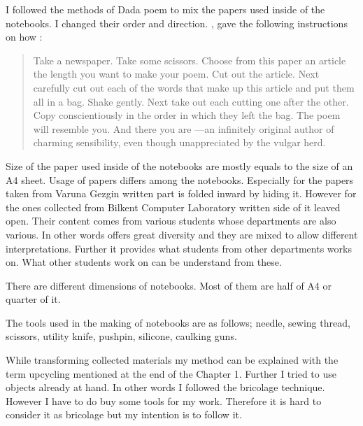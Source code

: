 I followed the methods of Dada poem to mix the papers used inside of the notebooks. I changed their order and direction. 
\cite{tzara1977seven}, gave the following instructions on how :

\begin{quote}
Take a newspaper. Take some scissors. Choose from this paper an article the length you want to make your poem. Cut out the article. Next carefully cut out each of the words that make up this article and put them all in a bag. Shake gently. Next take out each cutting one after the other. Copy conscientiously in the order in which they left the bag. The poem will resemble you. And there you are ---an infinitely original author of charming sensibility, even though unappreciated by the vulgar herd.
\end{quote}


Size of the paper used inside of the notebooks are mostly equals to the size of an A4 sheet. Usage of papers differs among the notebooks. Especially for the papers taken from Varuna Gezgin written part is folded inward by hiding it. However for the ones collected from Bilkent Computer Laboratory written side of it leaved open. Their content comes from various students whose departments are also various. In other words offers great diversity and they are mixed to allow different interpretations. Further it provides what students from other departments works on. What other students work on can be understand from these.

There are different dimensions of notebooks. Most of them are half of A4 or quarter of it.




The tools used in the making of notebooks are as follows; needle, sewing thread, scissors, utility knife, pushpin, silicone, caulking guns.

While transforming collected materials my method can be explained with the term upcycling mentioned at the end of the Chapter 1. Further I tried to use objects already at hand. In other words I followed the bricolage technique. However I have to do buy some tools for my work. Therefore it is hard to consider it as bricolage but my intention is to follow it.

